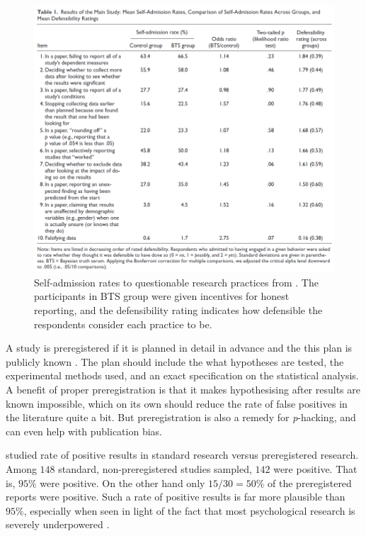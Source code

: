 \begin{figure}
\noindent \begin{centering}
\includegraphics[scale=0.4]{chunks/john2012}
\par\end{centering}
\caption{\label{fig:john2012}Self-admission rates to questionable research practices from \textcite{John2012-xp}. The participants in BTS group were given incentives for honest reporting, and the defensibility rating indicates how defensible the respondents consider each practice to be.}
\end{figure}

A study is preregistered if it is planned in detail in advance and the this plan is publicly known . The plan should include the what hypotheses are tested, the experimental methods used, and an exact specification on the statistical analysis. A benefit of proper preregistration is that it makes hypothesising after results are known impossible, which on its own should reduce the rate of false positives in the literature quite a bit. But preregistration is also a remedy for \emph{p}-hacking, and can even help with publication bias.

\textcite{Scheel2020-sq} studied rate of positive results in standard research versus preregistered research. Among $148$ standard, non-preregistered studies sampled, $142$ were positive. That is, $95\%$ were positive. On the other hand only $15/30=50\%$ of the preregistered reports were positive. Such a rate of positive results is far more plausible than $95\%$, especially when seen in light of the fact that most psychological research is severely underpowered .

